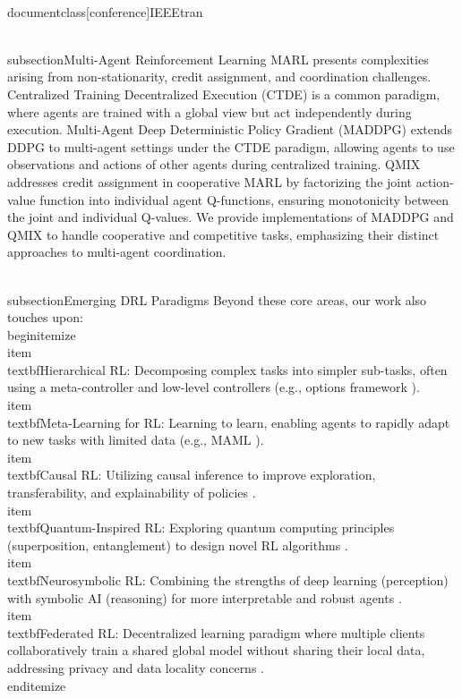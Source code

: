 \\documentclass[conference]{IEEEtran}
\begin{document}
\\subsection{Multi-Agent Reinforcement Learning}
MARL presents complexities arising from non-stationarity, credit assignment, and coordination challenges. Centralized Training Decentralized Execution (CTDE) is a common paradigm, where agents are trained with a global view but act independently during execution. Multi-Agent Deep Deterministic Policy Gradient (MADDPG) \cite{lowe2017multi} extends DDPG to multi-agent settings under the CTDE paradigm, allowing agents to use observations and actions of other agents during centralized training. QMIX \cite{rashid2018qmix} addresses credit assignment in cooperative MARL by factorizing the joint action-value function into individual agent Q-functions, ensuring monotonicity between the joint and individual Q-values. We provide implementations of MADDPG and QMIX to handle cooperative and competitive tasks, emphasizing their distinct approaches to multi-agent coordination.

\\subsection{Emerging DRL Paradigms}
Beyond these core areas, our work also touches upon:
\\begin{itemize}
    \\item \\textbf{Hierarchical RL:} Decomposing complex tasks into simpler sub-tasks, often using a meta-controller and low-level controllers (e.g., options framework \cite{sutton1999between}).
    \\item \\textbf{Meta-Learning for RL:} Learning to learn, enabling agents to rapidly adapt to new tasks with limited data (e.g., MAML \cite{finn2017model}).
    \\item \\textbf{Causal RL:} Utilizing causal inference to improve exploration, transferability, and explainability of policies \cite{bareinboim2015causal}.
    \\item \\textbf{Quantum-Inspired RL:} Exploring quantum computing principles (superposition, entanglement) to design novel RL algorithms \cite{dong2008quantum}.
    \\item \\textbf{Neurosymbolic RL:} Combining the strengths of deep learning (perception) with symbolic AI (reasoning) for more interpretable and robust agents \cite{garcez2019neurosymbolic}.
    \\item \\textbf{Federated RL:} Decentralized learning paradigm where multiple clients collaboratively train a shared global model without sharing their local data, addressing privacy and data locality concerns \cite{mcmahan2017communication}.
\\end{itemize}
\end{document}
